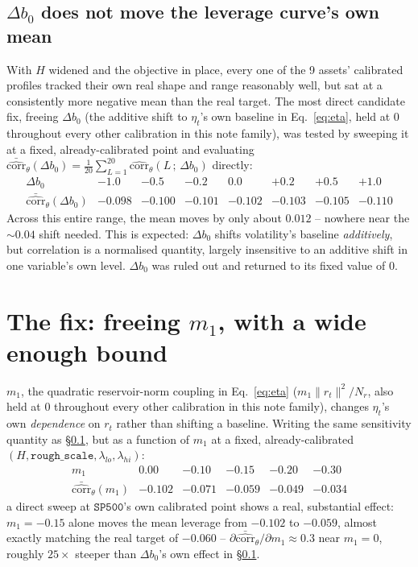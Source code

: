 \documentclass[11pt]{article}
\begin{document}
\subsection{$\Delta b_0$ does not move the leverage curve's own mean}
\label{sec:b0delta}
With $H$ widened and the objective in place, every one of the 9 assets'
calibrated profiles tracked their own real shape and range reasonably well,
but sat at a consistently more negative mean than the real target. The most
direct candidate fix, freeing $\Delta b_0$ (the additive shift to $\eta_t$'s
own baseline in Eq.~\ref{eq:eta}, held at $0$ throughout every other
calibration in this note family), was tested by sweeping it at a fixed,
already-calibrated point and evaluating
$\bar{\widehat{\text{corr}}}_\theta(\Delta b_0) = \tfrac{1}{20}
\sum_{L=1}^{20}\widehat{\text{corr}}_{\theta}(L\,;\,\Delta b_0)$ directly:
\[
\begin{array}{lccccccc}
\Delta b_0 & -1.0 & -0.5 & -0.2 & 0.0 & +0.2 & +0.5 & +1.0 \\
\bar{\widehat{\text{corr}}}_\theta(\Delta b_0) & -0.098 & -0.100 & -0.101 & -0.102 & -0.103 & -0.105 & -0.110
\end{array}
\]
Across this entire range, the mean moves by only about $0.012$ -- nowhere
near the $\sim0.04$ shift needed. This is expected: $\Delta b_0$ shifts
volatility's baseline \emph{additively}, but correlation is a normalised
quantity, largely insensitive to an additive shift in one variable's own
level. $\Delta b_0$ was ruled out and returned to its fixed value of $0$.

\section{The fix: freeing $m_1$, with a wide enough bound}
\label{sec:m1fix}
$m_1$, the quadratic reservoir-norm coupling in Eq.~\ref{eq:eta}
($m_1\lVert r_t\rVert^2/N_r$, also held at $0$ throughout every other
calibration in this note family), changes $\eta_t$'s own \emph{dependence}
on $r_t$ rather than shifting a baseline. Writing the same sensitivity
quantity as \S\ref{sec:b0delta}, but as a function of $m_1$ at a fixed,
already-calibrated $(H,\texttt{rough\_scale},\lambda_{lo},\lambda_{hi})$:
\[
\begin{array}{lccccc}
m_1 & 0.00 & -0.10 & -0.15 & -0.20 & -0.30 \\
\bar{\widehat{\text{corr}}}_\theta(m_1) & -0.102 & -0.071 & -0.059 & -0.049 & -0.034
\end{array}
\]
a direct sweep at $\texttt{SP500}$'s own calibrated point shows a real,
substantial effect: $m_1=-0.15$ alone moves the mean leverage from $-0.102$
to $-0.059$, almost exactly matching the real target of $-0.060$ --
$\partial\bar{\widehat{\text{corr}}}_\theta/\partial m_1\approx0.3$ near
$m_1=0$, roughly $25\times$ steeper than $\Delta b_0$'s own effect in
\S\ref{sec:b0delta}.
\end{document}
